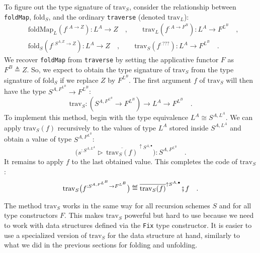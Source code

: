 To figure out the type signature of $\text{trav}_{S}$, consider the
relationship between \lstinline!foldMap!, $\text{fold}_{S}$, and
the ordinary \lstinline!traverse! (denoted $\text{trav}_{L}$):
\begin{align*}
 & \text{foldMap}_{L}(f^{:A\rightarrow Z}):L^{A}\rightarrow Z\quad,\quad\quad\text{trav}_{L}(f^{:A\rightarrow F^{B}}):L^{A}\rightarrow F^{L^{B}}\quad,\\
 & \text{fold}_{S}(f^{:S^{A,Z}\rightarrow Z}):L^{A}\rightarrow Z\quad,\quad\quad\text{trav}_{S}(f^{:???}):L^{A}\rightarrow F^{L^{B}}\quad.
\end{align*}
We recover \lstinline!foldMap! from \lstinline!traverse! by setting
the applicative functor $F$ as $F^{B}\triangleq Z$. So, we expect
to obtain the type signature of $\text{trav}_{S}$ from the type signature
of $\text{fold}_{S}$ if we replace $Z$ by $F^{L^{B}}$. The first
argument $f$ of $\text{trav}_{S}$ will then have the type $S^{A,F^{L^{B}}}\rightarrow F^{L^{B}}$:
\[
\text{trav}_{S}:(S^{A,F^{L^{B}}}\rightarrow F^{L^{B}})\rightarrow L^{A}\rightarrow F^{L^{B}}\quad.
\]
To implement this method, begin with the type equivalence $L^{A}\cong S^{A,L^{A}}$.
We can apply $\text{trav}_{S}(f)$ recursively to the values of type
$L^{A}$ stored inside $S^{A,L^{A}}$ and obtain a value of type $S^{A,F^{L^{B}}}$:
\[
\big(s^{:S^{A,L^{A}}}\triangleright\,\overline{\text{trav}_{S}(f)}^{\uparrow S^{A,\bullet}}\big):S^{A,F^{L^{B}}}\quad.
\]
It remains to apply $f$ to the last obtained value. This completes
the code of $\text{trav}_{S}$: 
\[
\text{trav}_{S}\big(f^{:S^{A,F^{L^{B}}}\rightarrow F^{L^{B}}}\big)\triangleq\overline{\text{trav}_{S}(f)}^{\uparrow S^{A,\bullet}}\bef f\quad.
\]

The method $\text{trav}_{S}$ works in the same way for all recursion
schemes $S$ and for all type constructors $F$. This makes $\text{trav}_{S}$
powerful but hard to use because we need to work with data structures
defined via the \lstinline!Fix! type constructor. It is easier to
use a specialized version of $\text{trav}_{S}$ for the data structure
at hand, similarly to what we did in the previous sections for folding
and unfolding. 

